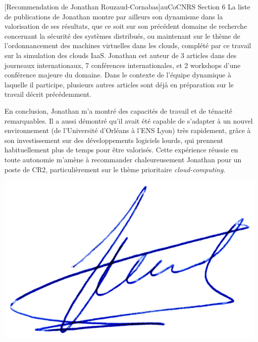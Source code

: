 \documentclass[a4paper,10pt]{article}
\begin{document}
\begin{letter}[Recommendation de Jonathan Rouzaud-Cornabas]{au}{CoCNRS Section 6}
La liste de  publications de Jonathan montre par ailleurs  son dynamisme dans la
valorisation  de  ses résultats,  que  ce  soit  sur  son précédent  domaine  de
recherche concernant la  sécurité des systèmes distribués, ou  maintenant sur le
thème de l'ordonnancement des machines  virtuelles dans les clouds, complété par
ce travail sur la simulation des clouds  IaaS. Jonathan est auteur de 3 articles
dans des journeaux internationaux, 7 conférences internationales, et 2 workshops
d'une conférence  majeure du domaine. Dans  le contexte de l'équipe  dynamique à
laquelle il participe, plusieurs autres articles sont déjà en préparation sur le
travail décrit précédemment.

En  conclusion, Jonathan  m'a montré  des capacités  de travail  et de  ténacité
remarquables.  Il  a aussi démontré  qu'il avait été  capable de s'adapter  à un
nouvel  environnement   (de  l'Université   d'Orléans  à l'ENS   Lyon)  très
rapidement, gr\^ace à son investissement  sur des développements logiciels lourds,
qui prennent habituellement plus de  temps pour être valorisés. Cette expérience
réussie en toute  autonomie m'amène à recommander  chaleureusement Jonathan pour
un    poste    de   CR2,    particulièrement    sur    le   thème    prioritaire
\textit{cloud-computing}.





\end{letter}
\begin{flushright}
\includegraphics[width=.30\textwidth]{signgenaud.jpg}
\end{flushright}
\end{document}
